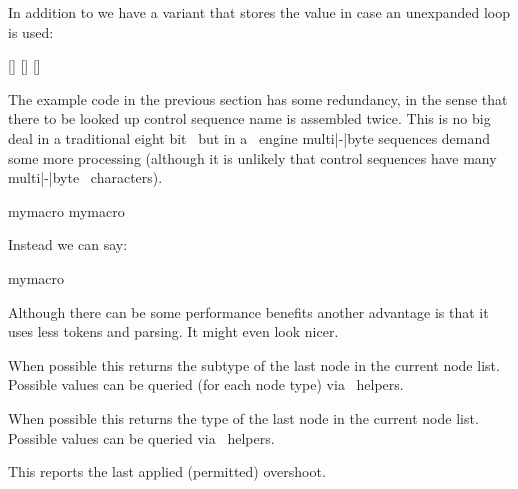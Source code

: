 \startnewprimitive[title={\prm {lastloopiterator}}]

In addition to  we have a variant that stores the value
in case an unexpanded loop is used:

\startbuffer
{} { [\the\currentloopiterator\eq\the\lastloopiterator] }
 { [\the\currentloopiterator\eq\the\lastloopiterator] }
 { [\the\currentloopiterator\ne\the\lastloopiterator] }
\stopbuffer

\typebuffer

\startlines
\getbuffer
\stoplines

\stopnewprimitive

\startnewprimitive[title={\prm {lastnamedcs}}]

The example code in the previous section has some redundancy, in the sense that
there to be looked up control sequence name  is assembled twice.
This is no big deal in a traditional eight bit \TEX\ but in a \UNICODE\ engine
multi|-|byte sequences demand some more processing (although it is unlikely that
control sequences have many multi|-|byte \ characters).

\starttyping
\ifcsname mymacro\endcsname
    \csname mymacro\endcsname
\fi
\stoptyping

Instead we can say:

\starttyping
\ifcsname mymacro\endcsname
    \lastnamedcs
\fi
\stoptyping

Although there can be some performance benefits another advantage is that it uses
less tokens and parsing. It might even look nicer.

\stopnewprimitive

\startnewprimitive[title={\prm {lastnodesubtype}}]

When possible this returns the subtype of the last node in the current node list.
Possible values can be queried (for each node type) via \LUA\ helpers.

\stopnewprimitive

\startoldprimitive[title={\prm {lastnodetype}}]

When possible this returns the type of the last node in the current node list.
Possible values can be queried via \LUA\ helpers.

\stopoldprimitive

\startnewprimitive[title={\prm {lastpageextra}}]

This reports the last applied (permitted) overshoot.

